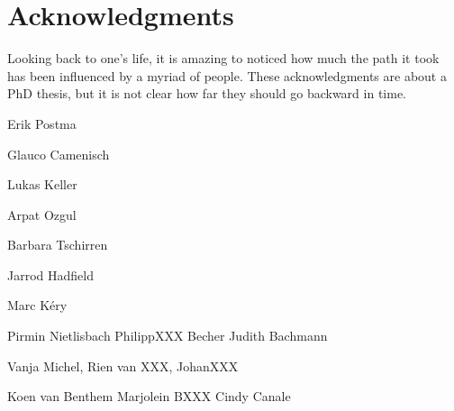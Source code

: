 \chapter{Acknowledgments}

Looking back to one's life, it is amazing to noticed how much the path it took has been influenced by a myriad of people. These acknowledgments are about a PhD thesis, but it is not clear how far they should go backward in time.

Erik Postma

Glauco Camenisch

Lukas Keller

Arpat Ozgul

Barbara Tschirren

Jarrod Hadfield

Marc K\'{e}ry

Pirmin Nietlisbach
PhilippXXX Becher
Judith Bachmann

Vanja Michel, Rien van XXX, JohanXXX

Koen van Benthem
Marjolein BXXX
Cindy Canale


